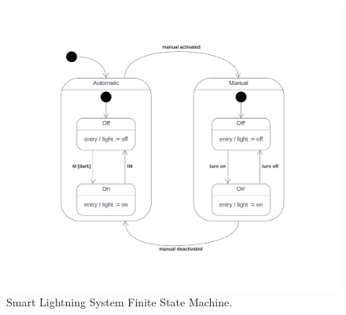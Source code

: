 \documentclass[a4paper,12pt]{report}
\begin{document}
\begin{figure}[H]
\centering
\includegraphics[width=\textwidth]{img/State - Light.png}
\caption{Smart Lightning System Finite State Machine.}
\label{fig:FSMSmartLightning}
\end{figure}
\end{document}
